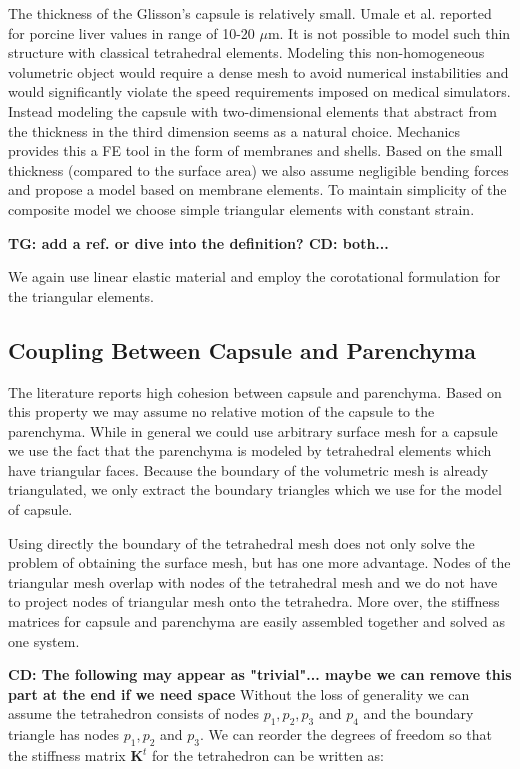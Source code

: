 \documentclass{llncs}
\newcommand{\TG}[1]{{\color{blue}\textbf{TG: #1}}}
\newcommand{\CD}[1]{{\color{green}\textbf{CD: #1}}}
\newcommand{\Mat}[1]{\mathbf{#1}}
\begin{document}
The thickness of the Glisson's capsule is relatively small. Umale et al.
\cite{Umale2011} reported for porcine liver values in range of 10-20
$\mu$m.
It is not possible to model such thin structure with classical tetrahedral
elements. Modeling this non-homogeneous volumetric object would require a
dense mesh to avoid numerical instabilities and would significantly
violate the speed requirements imposed on medical simulators.
Instead modeling the capsule with two-dimensional elements that abstract from the
thickness in the third dimension seems
as a natural choice. Mechanics provides this a FE tool in the form of membranes
and shells. Based on the small thickness (compared to the surface area) we also
assume negligible bending forces and propose a model based on membrane
elements. 
To maintain simplicity of the composite model we choose simple triangular
elements with constant strain.

\TG{add a ref. or dive into the definition? \cite{Felippa2003}} \CD{both...}

We again use linear elastic material and employ the corotational formulation
for the triangular elements.


\subsection{Coupling Between Capsule and Parenchyma} %

The literature reports high cohesion between capsule and parenchyma.
Based on this
property we may assume no relative motion of the capsule to the parenchyma.
While in general we could use arbitrary surface mesh for a capsule we use
the fact that the parenchyma is modeled by tetrahedral elements which have
triangular faces. Because the boundary of the volumetric mesh is already
triangulated, we only extract the boundary triangles which we use for the
model of capsule.

Using directly the boundary of the tetrahedral mesh does not only solve the
problem of obtaining the surface mesh, but has one more advantage. Nodes
of the triangular mesh overlap with nodes of the tetrahedral mesh and we do
not have to project nodes of triangular mesh onto the tetrahedra. More over,
the stiffness matrices for capsule and parenchyma are easily assembled
together and solved as one system.

\CD{The following may appear as "trivial"... maybe we can remove this part at the end if we need space} 
Without the loss of generality we can assume the tetrahedron consists of
nodes $p_1, p_2, p_3$ and $p_4$ and the boundary triangle has nodes $p_1, p_2$
and $p_3$. We can reorder the degrees of freedom so that the stiffness
matrix $\Mat{K}^t$ for the tetrahedron can be written as:
\end{document}
